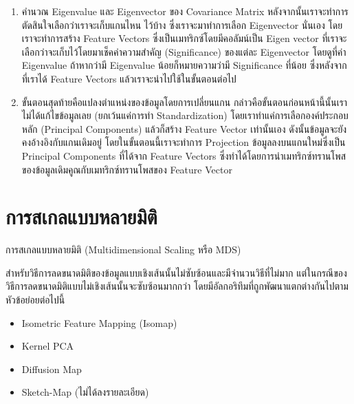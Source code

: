 \begin{enumerate}
    \item คำนวณ Eigenvalue และ Eigenvector ของ Covariance Matrix หลังจากนั้นเราจะทำการตัดสินใจเลือกว่าเราจะเก็บแกนไหน%
    ไว้บ้าง ซึ่งเราจะมาทำการเลือก Eigenvector นั่นเอง โดยเราจะทำการสร้าง Feature Vectors ซึ่งเป็นเมทริกซ์โดยมีคอลัมน์เป็น Eigen%
    vector ที่เราจะเลือกว่าจะเก็บไว้โดยมาเช็คค่าความสำคัญ (Significance) ของแต่ละ Eigenvector โดยดูที่ค่า Eigenvalue ถ้าหากว่ามี
    Eigenvalue น้อยก็หมายความว่ามี Significance ที่น้อย ซึ่งหลังจากที่เราได้ Feature Vectors แล้วเราจะนำไปใช้ในขั้นตอนต่อไป

    \item ขั้นตอนสุดท้ายคือแปลงตำแหน่งของข้อมูลโดยการเปลี่ยนแกน กล่าวคือขั้นตอนก่อนหน้านี้นั้นเราไม่ได้แก้ไขข้อมูลเลย (ยกเว้นแค่การทำ 
    Standardization) โดยเราทำแค่การเลือกองค์ประกอบหลัก (Principal Components) แล้วก็สร้าง Feature Vector เท่านั้นเอง 
    ดังนั้นข้อมูลจะยังคงอ้างอิงกับแกนเดิมอยู่ โดยในขั้นตอนนี้เราจะทำการ Projection ข้อมูลลงบนแกนใหม่ซึ่งเป็น Principal Components 
    ที่ได้จาก Feature Vectors ซึ่งทำได้โดยการนำเมทริกซ์ทรานโพสของข้อมูลเดิมคูณกับเมทริกซ์ทรานโพสของ Feature Vector

\end{enumerate}

\section{การสเกลแบบหลายมิติ}
\label{sec:mds}

การสเกลแบบหลายมิติ (Multidimensional Scaling หรือ MDS)\autocite{young1938,torgerson1952}

สำหรับวิธีการลดขนาดมิติของข้อมูลแบบเชิงเส้นนั้นไม่ซับซ้อนและมีจำนวนวิธีที่ไม่มาก แต่ในกรณีของวิธีการลดขนาดมิติแบบไม่เชิงเส้นนั้นจะซับซ้อนมากกว่า
โดยมีอัลกอริทึมที่ถูกพัฒนาแตกต่างกันไปตามหัวข้อย่อยต่อไปนี้\autocite{glielmo2021}

\begin{itemize}[topsep=0pt]
    \item Isometric Feature Mapping (Isomap)
    
    \item Kernel PCA
    
    \item Diffusion Map
    
    \item Sketch-Map (ไม่ได้ลงรายละเอียด)
\end{itemize}

